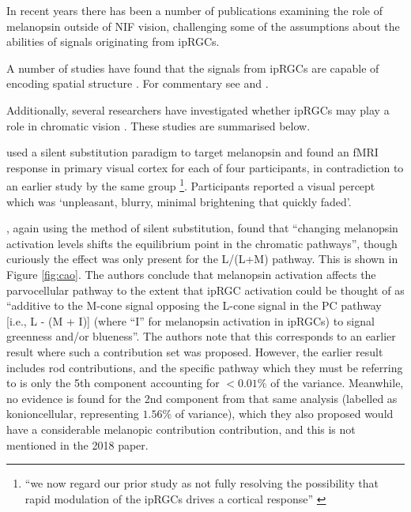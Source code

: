 In recent years there has been a number of publications examining the role of melanopsin outside of \gls{NIF} vision, challenging some of the assumptions about the abilities of signals originating from \glspl{ipRGC}.

A number of studies have found that the signals from ipRGCs are capable of encoding spatial structure \citep{ecker_melanopsin-expressing_2010, mouland_responses_2017, allen_melanopsin_2017, allen_form_2019, zhao_photoresponse_2014}. For commentary see \citet{spitschan_vision_2017} and \citet{sonoda_re-evaluating_2016}.

Additionally, several researchers have investigated whether \glspl{ipRGC} may play a role in chromatic vision \citep{cao_evidence_2018, spitschan_human_2017-1,zele_melanopsin_2018}. These studies are summarised below.

\citet{spitschan_human_2017-1} used a silent substitution paradigm to target melanopsin and found an fMRI response in primary visual cortex for each of four participants, in contradiction to an earlier study by the same group \citep{spitschan_human_2016}\footnote{``we now regard our prior study as not fully resolving the possibility that rapid modulation of the ipRGCs drives a cortical response'' \citep{spitschan_human_2017-1}}. Participants reported a visual percept which was `unpleasant, blurry, minimal brightening that quickly faded'.

\citet{cao_evidence_2018}, again using the method of silent substitution, found that ``changing melanopsin activation levels shifts the equilibrium point in the chromatic pathways'', though curiously the effect was only present for the L/(L+M) pathway. This is shown in Figure \ref{fig:cao}. The authors conclude that melanopsin activation affects the parvocellular pathway to the extent that \gls{ipRGC} activation could be thought of as ``additive to the M-cone signal opposing the L-cone signal in the PC pathway [i.e., L - (M + I)] (where ``I'' for melanopsin activation in ipRGCs) to signal greenness and/or blueness''. The authors note that this corresponds to an earlier result \citep{barrionuevo_contributions_2014} where such a contribution set was proposed. However, the earlier result includes rod contributions, and the specific pathway which they must be referring to is only the 5th component accounting for $<0.01\%$ of the variance. Meanwhile, no evidence is found for the 2nd component from that same analysis (labelled as konioncellular, representing $1.56\%$ of variance), which they also proposed would have a considerable melanopic contribution contribution, and this is not mentioned in the 2018 paper.

